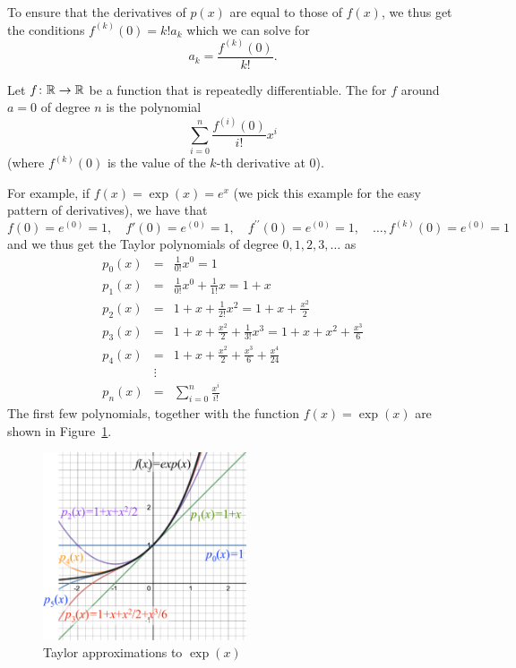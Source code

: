 To ensure that the derivatives of $p(x)$ are equal to those of $f(x)$, we
thus get the conditions $f^{(k)}(0)=k! a_k$ which we can solve for
\[
a_k=\frac{f^{(k)}(0)}{k!}.
\]
\begin{defn}
Let $f\colon{\mathbb R}\to{\mathbb R}$ be a function that is repeatedly differentiable.
The 
for $f$ around $a=0$ of degree $n$ is the polynomial
\[
\sum_{i=0}^n\frac{f^{(i)}(0)}{i!} x^i
\]
(where $f^{(k)}(0)$ is the value of the $k$-th derivative at $0$).
\end{defn}
For example, if $f(x)=\exp(x)=e^x$ (we pick this example for the easy pattern of
derivatives), we have that
\[
f(0)=e^{(0)}=1,\quad
f'(0)=e^{(0)}=1,\quad
f^{\prime\prime}(0)=e^{(0)}=1,\quad\ldots,
f^{(k)}(0)=e^{(0)}=1
\]
and we thus get the Taylor polynomials of degree $0,1,2,3,\ldots$ as
\begin{eqnarray*}
p_0(x)&=&\frac{1}{0!}x^0=1\\
p_1(x)&=&\frac{1}{0!}x^0+\frac{1}{1!}x=1+x\\
p_2(x)&=&1+x+\frac{1}{2!}x^2=1+x+\frac{x^2}{2}\\
p_3(x)&=&1+x+\frac{x^2}{2}+\frac{1}{3!}x^3=1+x+x^2+\frac{x^3}{6}\\
p_4(x)&=&1+x+\frac{x^2}{2}+\frac{x^3}{6}+\frac{x^4}{24}\\
&\vdots&\\
p_n(x)&=&\sum_{i=0}^n \frac{x^i}{i!}
\end{eqnarray*}
The first few polynomials, together with the function $f(x)=\exp(x)$ are
shown in Figure~\ref{figtayexp}.
\begin{figure}
\begin{center}
\includegraphics[width=6cm]{pic/TaylorExp.pdf}
\end{center}
\caption{Taylor approximations to $\exp(x)$}
\label{figtayexp}
\end{figure}


